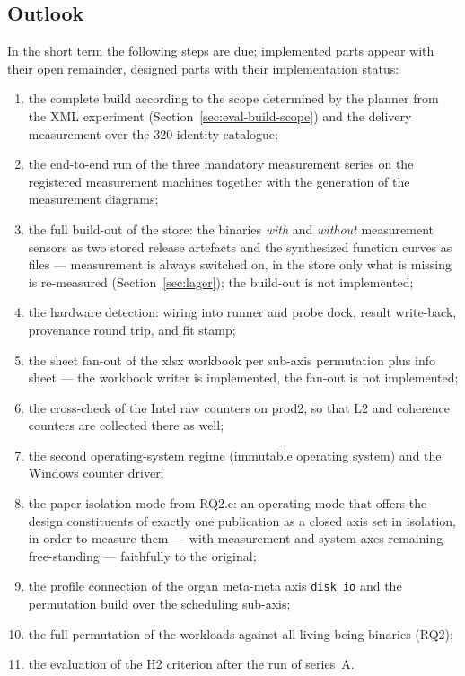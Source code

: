 \begin{nurlang}
\section{Outlook}\label{sec:outlook}
In the short term the following steps are due; implemented parts appear with their open remainder,
designed parts with their implementation status:
\begin{enumerate}[label=(\arabic*)]
  \item the complete build according to the scope determined by the planner from the XML experiment
  (Section~\ref{sec:eval-build-scope}) and
  the delivery measurement over the 320-identity catalogue;
  \item the end-to-end run of the three mandatory measurement series on the registered measurement
  machines together with the generation of the measurement diagrams;
  \item the full build-out of the store: the binaries \emph{with} and \emph{without} measurement
  sensors as two stored release artefacts and the synthesized function curves as files ---
  measurement is always switched on, in the store only what is missing is re-measured
  (Section~\ref{sec:lager}); the build-out is not implemented;
  \item the hardware detection: wiring into runner and probe dock, result write-back, provenance
  round trip, and fit stamp;
  \item the sheet fan-out of the xlsx workbook per sub-axis permutation plus info sheet --- the
  workbook writer is implemented, the fan-out is not implemented;
  \item the cross-check of the Intel raw counters on prod2, so that L2 and coherence counters are
  collected there as well;
  \item the second operating-system regime (immutable operating system) and the Windows counter
  driver;
  \item the paper-isolation mode from RQ2.c: an operating mode that offers the design constituents
  of exactly one publication as a closed axis set in isolation, in order to measure them --- with
  measurement and system axes remaining free-standing --- faithfully to the original;
  \item the profile connection of the organ meta-meta axis \texttt{disk\_io} and the permutation
  build over the scheduling sub-axis;
  \item the full permutation of the workloads against all living-being binaries (RQ2);
  \item the evaluation of the H2 criterion after the run of series~A\@.
\end{enumerate}


\end{nurlang}

